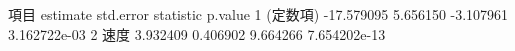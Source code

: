          項目   estimate std.error statistic      p.value
1 (定数項) -17.579095  5.656150 -3.107961 3.162722e-03
2       速度   3.932409  0.406902  9.664266 7.654202e-13

